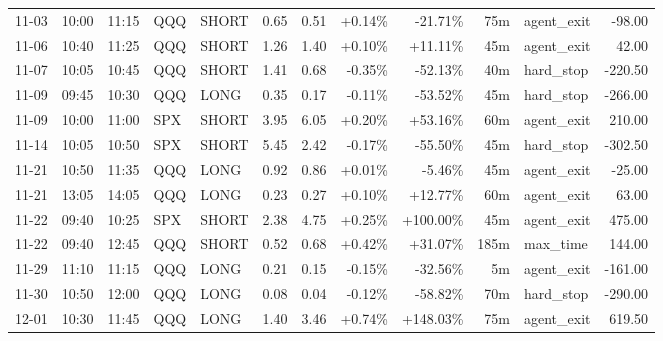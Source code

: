 \documentclass[11pt,a4paper,twoside]{article}
\begin{document}
\begin{center}
\begin{longtable}{>{\color{txtmain}}l l l l l r r r r r >{\color{txtmain}}l r}
11-03 & 10:00 & 11:15 & QQQ & SHORT & 0.65 & 0.51 & \textcolor{wingreen}{+0.14\%} & \textcolor{lossred}{-21.71\%} & 75m & agent\_exit & \textcolor{lossred}{-98.00} \\
11-06 & 10:40 & 11:25 & QQQ & SHORT & 1.26 & 1.40 & \textcolor{wingreen}{+0.10\%} & \textcolor{wingreen}{+11.11\%} & 45m & agent\_exit & \textcolor{wingreen}{42.00} \\
11-07 & 10:05 & 10:45 & QQQ & SHORT & 1.41 & 0.68 & \textcolor{lossred}{-0.35\%} & \textcolor{lossred}{-52.13\%} & 40m & hard\_stop & \textcolor{lossred}{-220.50} \\
11-09 & 09:45 & 10:30 & QQQ & LONG & 0.35 & 0.17 & \textcolor{lossred}{-0.11\%} & \textcolor{lossred}{-53.52\%} & 45m & hard\_stop & \textcolor{lossred}{-266.00} \\
11-09 & 10:00 & 11:00 & SPX & SHORT & 3.95 & 6.05 & \textcolor{wingreen}{+0.20\%} & \textcolor{wingreen}{+53.16\%} & 60m & agent\_exit & \textcolor{wingreen}{210.00} \\
11-14 & 10:05 & 10:50 & SPX & SHORT & 5.45 & 2.42 & \textcolor{lossred}{-0.17\%} & \textcolor{lossred}{-55.50\%} & 45m & hard\_stop & \textcolor{lossred}{-302.50} \\
11-21 & 10:50 & 11:35 & QQQ & LONG & 0.92 & 0.86 & \textcolor{wingreen}{+0.01\%} & \textcolor{lossred}{-5.46\%} & 45m & agent\_exit & \textcolor{lossred}{-25.00} \\
11-21 & 13:05 & 14:05 & QQQ & LONG & 0.23 & 0.27 & \textcolor{wingreen}{+0.10\%} & \textcolor{wingreen}{+12.77\%} & 60m & agent\_exit & \textcolor{wingreen}{63.00} \\
11-22 & 09:40 & 10:25 & SPX & SHORT & 2.38 & 4.75 & \textcolor{wingreen}{+0.25\%} & \textcolor{wingreen}{+100.00\%} & 45m & agent\_exit & \textcolor{wingreen}{475.00} \\
11-22 & 09:40 & 12:45 & QQQ & SHORT & 0.52 & 0.68 & \textcolor{wingreen}{+0.42\%} & \textcolor{wingreen}{+31.07\%} & 185m & max\_time & \textcolor{wingreen}{144.00} \\
11-29 & 11:10 & 11:15 & QQQ & LONG & 0.21 & 0.15 & \textcolor{lossred}{-0.15\%} & \textcolor{lossred}{-32.56\%} & 5m & agent\_exit & \textcolor{lossred}{-161.00} \\
11-30 & 10:50 & 12:00 & QQQ & LONG & 0.08 & 0.04 & \textcolor{lossred}{-0.12\%} & \textcolor{lossred}{-58.82\%} & 70m & hard\_stop & \textcolor{lossred}{-290.00} \\
12-01 & 10:30 & 11:45 & QQQ & LONG & 1.40 & 3.46 & \textcolor{wingreen}{+0.74\%} & \textcolor{wingreen}{+148.03\%} & 75m & agent\_exit & \textcolor{wingreen}{619.50} \\

\end{longtable}
\end{center}
\end{document}
